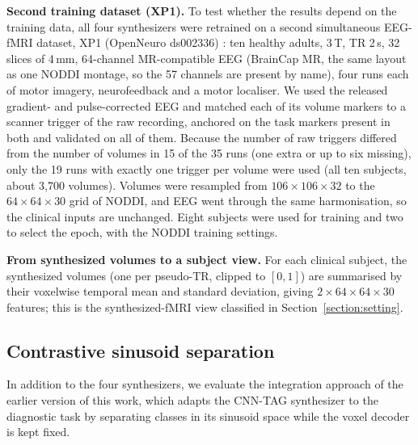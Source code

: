\documentclass[pdflatex,referee,sn-basic]{sn-jnl}%
\begin{document}
\noindent\textbf{Second training dataset (XP1).} To test whether the results depend on the training data, all four synthesizers were retrained on a second simultaneous EEG-fMRI dataset, XP1 (OpenNeuro ds002336) \cite{lioi2020xp}: ten healthy adults, 3\,T, TR 2\,s, 32 slices of 4\,mm, 64-channel MR-compatible EEG (BrainCap MR, the same layout as one NODDI montage, so the 57 channels are present by name), four runs each of motor imagery, neurofeedback and a motor localiser. We used the released gradient- and pulse-corrected EEG and matched each of its volume markers to a scanner trigger of the raw recording, anchored on the task markers present in both and validated on all of them. Because the number of raw triggers differed from the number of volumes in 15 of the 35 runs (one extra or up to six missing), only the 19 runs with exactly one trigger per volume were used (all ten subjects, about 3,700 volumes). Volumes were resampled from $106\times106\times32$ to the $64\times64\times30$ grid of NODDI, and EEG went through the same harmonisation, so the clinical inputs are unchanged. Eight subjects were used for training and two to select the epoch, with the NODDI training settings.

\noindent\textbf{From synthesized volumes to a subject view.} For each clinical subject, the synthesized volumes (one per pseudo-TR, clipped to $[0,1]$) are summarised by their voxelwise temporal mean and standard deviation, giving $2\times64\times64\times30$ features; this is the synthesized-fMRI view classified in Section~\ref{section:setting}.

\subsection{Contrastive sinusoid separation}\label{methods:separation}

In addition to the four synthesizers, we evaluate the integration approach of the earlier version of this work, which adapts the CNN-TAG synthesizer to the diagnostic task by separating classes in its sinusoid space while the voxel decoder is kept fixed.
\end{document}
